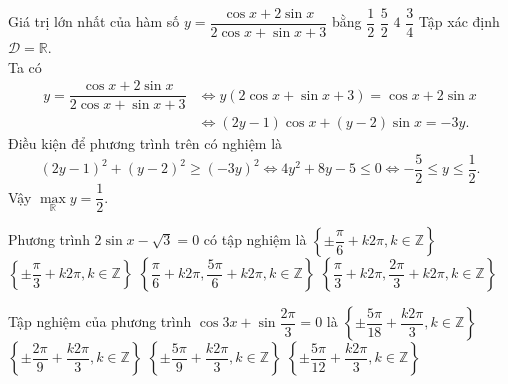 \begin{ex}%
Giá trị lớn nhất của hàm số $y = \dfrac{\cos x + 2\sin x}{2\cos x+\sin x+3}$ bằng
\choice
{\True $\dfrac{1}{2}$}
{$\dfrac{5}{2}$}
{$4$}
{$\dfrac{3}{4}$}
\loigiai
{
Tập xác định $\mathscr{D}=\mathbb{R}$. \\
Ta có
\[\begin{aligned}
y = \dfrac{\cos x + 2\sin x}{2\cos x+\sin x+3}&\Leftrightarrow y\left(2\cos x + \sin x + 3\right) = \cos x + 2\sin x\\
&\Leftrightarrow (2y - 1)\cos x + (y - 2)\sin x = -3y.
\end{aligned}\]
Điều kiện để phương trình trên có nghiệm là
\[(2y - 1)^2 + (y - 2)^2 \ge (-3y)^2\Leftrightarrow 4y^2 + 8y - 5\le 0 \Leftrightarrow -\dfrac{5}{2}\le y\le \dfrac{1}{2}.\]
Vậy $\max\limits_{\mathbb{R}} y=\dfrac{1}{2}$.
}
\end{ex}

\begin{ex}%
Phương trình $2\sin x-\sqrt{3}=0$ có tập nghiệm là
\choice
{$\left\{\pm\dfrac{\pi}{6}+k2\pi ,k\in\mathbb{Z}\right\}$}
{$\left\{\pm\dfrac{\pi}{3}+k2\pi ,k\in\mathbb{Z}\right\}$}
{$\left\{\dfrac{\pi}{6}+k2\pi ,\dfrac{5\pi}{6}+k2\pi ,k\in\mathbb{Z}\right\}$}
{\True $\left\{\dfrac{\pi}{3}+k2\pi ,\dfrac{2\pi}{3}+k2\pi ,k\in\mathbb{Z}\right\}$}
\loigiai{
$2\sin x-\sqrt{3}=0\Leftrightarrow\sin x=\dfrac{\sqrt{3}}{2}\Leftrightarrow\left[\begin{aligned}
& x=\dfrac{\pi}{3}+k2\pi\\
& x=\dfrac{2\pi}{3}+k2\pi\\
\end{aligned}\right.\left(k\in\mathbb{Z}\right).$\\
Vậy tập nghiệm của phương trình là  $S=\left\{\dfrac{\pi}{3}+k2\pi ,\dfrac{2\pi}{3}+k2\pi ,k\in\mathbb{Z}\right\}$}
\end{ex}

\begin{ex}%
Tập nghiệm của phương trình $\cos 3x+\sin \dfrac{2\pi }{3}=0$ là
\choice
{\True $\left\{ \pm \dfrac{5\pi }{18}+\dfrac{k2\pi }{3}, k\in \mathbb{Z} \right\}$}
{$\left\{ \pm \dfrac{2\pi }{9}+\dfrac{k2\pi }{3}, k\in \mathbb{Z} \right\}$}
{$\left\{ \pm \dfrac{5\pi }{9}+\dfrac{k2\pi }{3}, k\in \mathbb{Z} \right\}$}
{$\left\{ \pm \dfrac{5\pi }{12}+\dfrac{k2\pi }{3}, k\in \mathbb{Z} \right\}$}
\end{ex}


